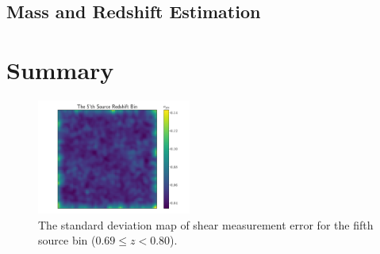 \documentclass[twocolumn]{aastex62}
\begin{document}
\subsection{Mass and Redshift Estimation}


\section{Summary}
\label{sec:Sum}

\begin{figure}[!ht]
 \centering
 \includegraphics[width=0.45\textwidth]{noise_std_map_pix.pdf}
 \caption{The standard deviation map of shear measurement error for the fifth source bin ($0.69 \leq z < 0.80 $).}
\end{figure}




\appendix
\end{document}
